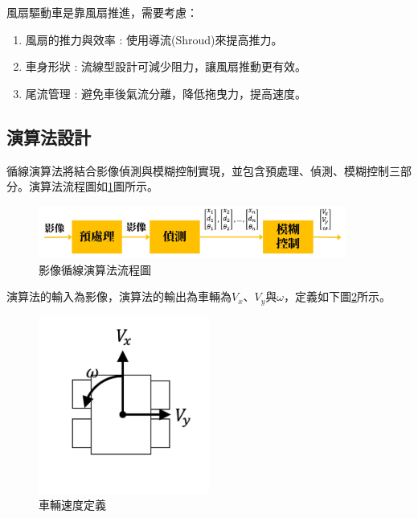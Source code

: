 \documentclass[12pt]{article}       %
\begin{document}
風扇驅動車是靠風扇推進，需要考慮：

\begin{enumerate}
    \item 風扇的推力與效率 : 使用導流(Shroud)來提高推力。
    \item 車身形狀 : 流線型設計可減少阻力，讓風扇推動更有效。
    \item 尾流管理 : 避免車後氣流分離，降低拖曳力，提高速度。
\end{enumerate}

\subsection{演算法設計} 
\hspace{2em}循線演算法將結合影像偵測與模糊控制實現，並包含預處理、偵測、模糊控制三部分。演算法流程圖如\ref{fig:9}圖所示。
\begin{figure}[H]
    \centering
    \includegraphics[width=0.9\textwidth]{9.jpg}     %
    \caption{影像循線演算法流程圖}    %
    \label{fig:9}    %
\end{figure}

演算法的輸入為影像，演算法的輸出為車輛為$V_{x}$、$V_{y}$與$\omega$，定義如下圖\ref{fig:10}所示。
\begin{figure}[H]
    \centering
    \includegraphics[width=0.5\textwidth]{10.jpg}     %
    \caption{車輛速度定義}    %
    \label{fig:10}    %
\end{figure}
\end{document}
